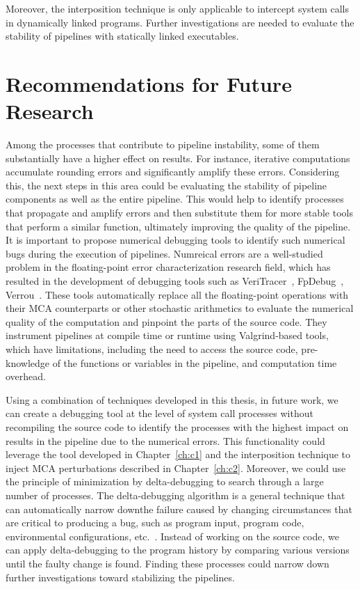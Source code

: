 Moreover, the interposition technique is only applicable to intercept system calls in dynamically linked programs. 
Further investigations are needed to evaluate the stability of pipelines with statically linked executables.


\section{Recommendations for Future Research}

Among the processes that contribute to pipeline instability, some of them substantially
have a higher effect on results. For instance, iterative computations accumulate rounding errors
and significantly amplify these errors. 
Considering this, the next steps in this area could be evaluating the stability of pipeline
components as well as the entire pipeline. This would help to identify processes that propagate
and amplify errors and then substitute them for more stable tools that perform a similar function,
ultimately improving the quality of the pipeline.
It is important to propose numerical debugging tools to identify such numerical bugs during the
execution of pipelines. Numreical errors are a well-studied problem in the floating-point error characterization
research field, which has resulted in the development of debugging tools such as VeriTracer~\cite{chatelain2018veritracer},
FpDebug~\cite{benz2012dynamic}, Verrou~\cite{fevotte2019debugging}.
These tools automatically replace all the floating-point operations with their MCA counterparts
or other stochastic arithmetics to evaluate the numerical quality of the computation and pinpoint the parts
of the source code.
They instrument pipelines at compile time or runtime using Valgrind-based tools,
which have limitations, including the need to access the source code, pre-knowledge of
the functions or variables in the pipeline, and computation time overhead.

Using a combination of techniques developed in this thesis, in future work,
we can create a debugging tool at the level of system call processes without
recompiling the source code to identify the processes with the highest impact on results in the pipeline due
to the numerical errors. 
This functionality could leverage the tool
developed in Chapter~\ref{ch:c1} and the interposition technique to inject MCA perturbations described in Chapter~\ref{ch:c2}.
Moreover, we could use the principle of minimization by delta-debugging to search through a large number of processes. 
The delta-debugging algorithm is a general technique that can automatically narrow downthe failure caused by changing circumstances
that are critical to producing a bug, such as program input, program code, environmental configurations,
etc.~\cite{zeller1999yesterday,zeller2002isolating}. Instead of working on the source code, we can apply delta-debugging to the
program history by comparing various versions until the faulty change is found. Finding these processes could
narrow down further investigations toward stabilizing the pipelines.

